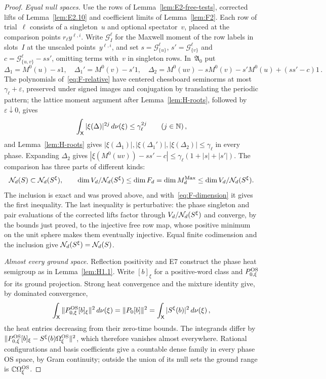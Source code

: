 \begin{proof}
\emph{Equal null spaces.} Use the rows of Lemma~\ref{lem:E2-free-tests}, corrected lifts of Lemma~\ref{lem:E2.10} and coefficient limits of Lemma~\ref{lem:F2}. Each row of trial~$\ell$ consists of a singleton~$u$ and optional spectator~$v$, placed at the comparison points $r_\ell y^{\ell,i}$. Write $\mathcal G_I^\ell$ for the Maxwell moment of the row labels in slots~$I$ at the unscaled points~$y^{\ell,i}$, and set $s=\mathcal G^\ell_{\{u\}}$, $s'=\mathcal G^\ell_{\{v\}}$ and $c=\mathcal G^\ell_{\{u,v\}}-ss'$, omitting terms with~$v$ in singleton rows. In~$\mathfrak A_0$ put
\begin{equation*}
\Delta_1=M^0(u)-s1,\quad\Delta_1'=M^0(v)-s'1,\quad
\Delta_2=M^0(uv)-sM^0(v)-s'M^0(u)+(ss'-c)1\,.
\end{equation*}
The polynomials of~\eqref{eq:F-relative} have centered chessboard seminorms at most $\gamma_\ell+\varepsilon$, preserved under signed images and conjugation by translating the periodic pattern; the lattice moment argument after Lemma~\ref{lem:H-roots}, followed by $\varepsilon\downarrow0$, gives
\begin{equation}\label{eq:H-moments}
\int_{\mathsf{X}}|\xi(\Delta)|^{2j}\,d\nu(\xi)\le\gamma_\ell^{2j}\qquad(j\in\mathbb{N})\,,
\end{equation}
and Lemma~\ref{lem:H-roots} gives $|\xi(\Delta_1)|,|\xi(\Delta_1')|,|\xi(\Delta_2)|\le\gamma_\ell$ in every phase. Expanding $\Delta_2$ gives $|\xi(M^0(uv))-ss'-c|\le\gamma_\ell(1+|s|+|s'|)$. The comparison has three parts of different kinds:
\begin{equation*}
\mathcal{N}_{d}(S)\subset\mathcal{N}_{d}(S^\xi),\qquad
\dim V_d/\mathcal{N}_{d}(S^\xi)\le\dim F_d=\dim M_{d}^{\mathrm{Max}}\le\dim V_d/\mathcal{N}_{d}(S^\xi).
\end{equation*}
The inclusion is exact and was proved above, and with~\eqref{eq:F-dimension} it gives the first inequality. The last inequality is perturbative: the phase singleton and pair evaluations of the corrected lifts factor through $V_d/\mathcal{N}_{d}(S^\xi)$ and converge, by the bounds just proved, to the injective free row map, whose positive minimum on the unit sphere makes them eventually injective. Equal finite codimension and the inclusion give $\mathcal{N}_{d}(S^\xi)=\mathcal{N}_{d}(S)$.

\emph{Almost every ground space.} Reflection positivity and E7 construct the phase heat semigroup as in Lemma~\ref{lem:H1.1}. Write $[b]_\xi$ for a positive-word class and $P_{0,\xi}^{\rm OS}$ for its ground projection. Strong heat convergence and the mixture identity give, by dominated convergence,
\begin{equation*}
\int_{\mathsf{X}}\|P_{0,\xi}^{\rm OS}[b]_\xi\|^2\,d\nu(\xi)
=\|P_0[b]\|^2=\int_{\mathsf{X}}|S^\xi(b)|^2\,d\nu(\xi)\,,
\end{equation*}
the heat entries decreasing from their zero-time bounds. The integrands differ by $\|P_{0,\xi}^{\rm OS}[b]_\xi-S^\xi(b)\Omega_\xi^{\rm OS}\|^2$, which therefore vanishes almost everywhere. Rational configurations and basis coefficients give a countable dense family in every phase OS space, by Gram continuity; outside the union of its null sets the ground range is $\mathbb{C}\Omega_\xi^{\rm OS}$.
\end{proof}

